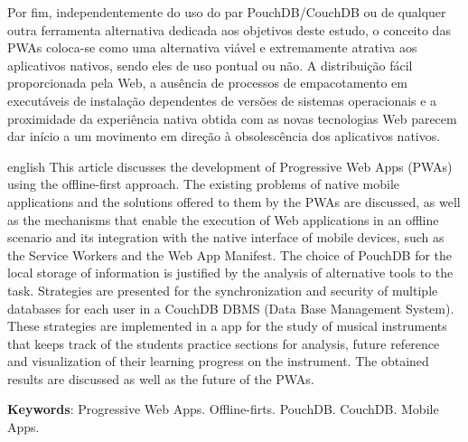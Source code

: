 \documentclass[
	article,			%
	11pt,				%
	oneside,			%
	a4paper,			%
	english,			%
	brazil,				%
	sumario=tradicional
	]{abntex2}
\begin{document}
Por fim, independentemente do uso do par PouchDB/CouchDB ou de qualquer outra ferramenta alternativa dedicada aos objetivos deste estudo, o conceito das PWAs coloca-se como uma alternativa viável e extremamente atrativa aos aplicativos nativos, sendo eles de uso pontual ou não. A distribuição fácil proporcionada pela Web, a ausência de processos de empacotamento em executáveis de instalação dependentes de versões de sistemas operacionais e a proximidade da experiência nativa obtida com as novas tecnologias Web parecem dar início a um movimento em direção à obsolescência dos aplicativos nativos.

\postextual



\emptythanks
\maketitle

\renewcommand{\resumoname}{Abstract}
\begin{resumoumacoluna}
 \begin{otherlanguage*}{english}
   This article discusses the development of Progressive Web Apps (PWAs) using
   the offline-first approach. The existing problems of native mobile applications and the solutions offered to them by the PWAs are discussed, as well as the mechanisms that enable the execution of Web applications in an offline scenario and its integration with the native interface of mobile devices, such as the Service Workers and the
   Web App Manifest. The choice of PouchDB for the local storage of information
   is justified by the analysis of alternative tools to the task. Strategies are
   presented for the synchronization and security of multiple databases for
   each user in a CouchDB DBMS (Data Base Management System). These strategies are implemented in a app for the study of musical instruments that keeps track of the students practice sections for analysis, future reference and visualization of their learning progress on the instrument. The obtained results are discussed as well as the future of the PWAs. 

   \vspace{\onelineskip}
 
   \noindent
   \textbf{Keywords}: Progressive Web Apps. Offline-firts. PouchDB. CouchDB. Mobile Apps.
 \end{otherlanguage*}  
\end{resumoumacoluna}



\end{document}
